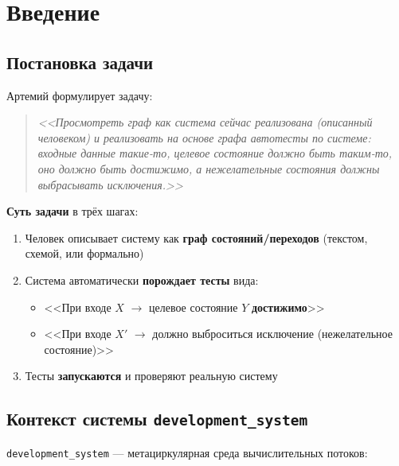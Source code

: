 \documentclass[10pt, oneside]{article}
\begin{document}
{\fontsize{8}{10}\selectfont\tableofcontents}
\newpage

\section{Введение}

\subsection{Постановка задачи}

Артемий формулирует задачу:

\begin{quote}
\itshape
<<Просмотреть граф как система сейчас реализована (описанный человеком) и
реализовать на основе графа автотесты по системе: входные данные такие-то,
целевое состояние должно быть таким-то, оно должно быть достижимо,
а нежелательные состояния должны выбрасывать исключения.>>
\end{quote}

\textbf{Суть задачи} в трёх шагах:

\begin{enumerate}[leftmargin=1.5em]
  \item Человек описывает систему как \textbf{граф состояний/переходов}
        (текстом, схемой, или формально)
  \item Система автоматически \textbf{порождает тесты} вида:
  \begin{itemize}
    \item <<При входе $X$ $\to$ целевое состояние $Y$ \textbf{достижимо}>>
    \item <<При входе $X'$ $\to$ должно выброситься исключение (нежелательное состояние)>>
  \end{itemize}
  \item Тесты \textbf{запускаются} и проверяют реальную систему
\end{enumerate}

\subsection{Контекст системы \texttt{development\_system}}

\texttt{development\_system} --- метациркулярная среда вычислительных потоков:
\end{document}
